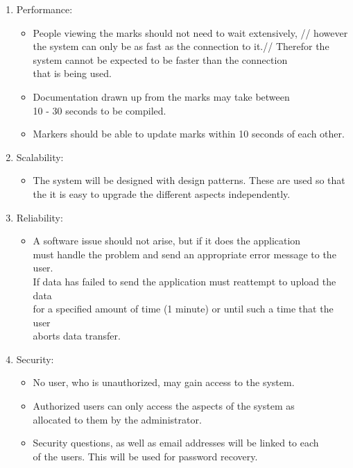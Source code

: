 \documentclass[12pt]{article}
\begin{document}
	\begin{enumerate}
	  \item Performance:		
		\begin{itemize} 
		 \item People viewing the marks should not need to wait extensively, //
		 		however the system can only be as fast as the connection to it.//
		 		Therefor the system cannot be expected to be faster than the connection\\
		 		that is being used.
		 \item Documentation drawn up from the marks may take between  \\
			   10 - 30 seconds to be compiled.
		 \item Markers should be able to update marks within 10 seconds of each other.
		\end{itemize}	

		\item Scalability:		
			\begin{itemize}
			\item The system will be designed with design patterns. These are used so that\\
			the it is easy to upgrade the different aspects independently. \\   
			\end{itemize}

	\item Reliability:		
			\begin{itemize}
			\item A software issue should not arise, but if it does the application \\
			must handle the problem and send an appropriate error message to the user. \\
			If data has failed to send the application must reattempt to upload the data \\
			for a specified amount of time (1 minute) or until such a time that the user \\
			aborts data transfer.
			
			\end{itemize}
			
			
	\item Security:		
			\begin{itemize}
			\item No user, who is unauthorized, may gain access to the system.
			\item Authorized users can only access the aspects of the system as \\
			allocated to them by the administrator.
			\item Security questions, as well as email addresses will be linked to each\\
				of the users. This will be used for password recovery.
			\end{itemize}
			

\end{enumerate}
\end{document}
